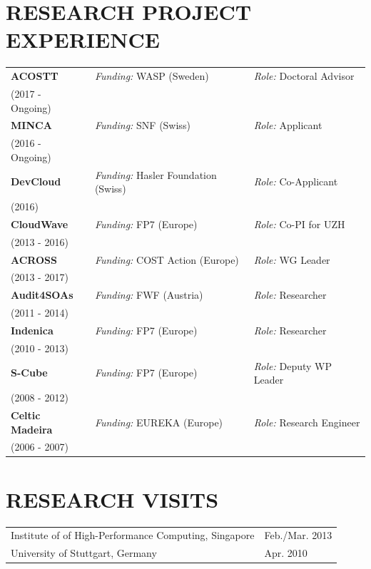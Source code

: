 \documentclass[paper=letter,fontsize=11pt]{scrartcl} %
\newcommand{\NewPart}[2]{\section*{\uppercase{#1} #2}}
\begin{document}
\NewPart{Research Project Experience}{}

  \begin{tabular}{p{4.8cm}ll}
		\textbf{ACOSTT} & \emph{Funding:} WASP (Sweden) & \emph{Role:} Doctoral Advisor \\
	(2017 - Ongoing) & & \\
      \textbf{MINCA} & \emph{Funding:} SNF (Swiss) & \emph{Role:} Applicant \\
    (2016 - Ongoing) & & \\
    \textbf{DevCloud} & \emph{Funding:} Hasler Foundation (Swiss) & \emph{Role:} Co-Applicant \\
    (2016) & & \\
    \textbf{CloudWave} & \emph{Funding:} FP7 (Europe) & \emph{Role:} Co-PI for UZH \\
    (2013 - 2016) & & \\
    \textbf{ACROSS}  & \emph{Funding:} COST Action (Europe) & \emph{Role:} WG Leader  \\
    (2013 - 2017) & & \\
    \textbf{Audit4SOAs}  & \emph{Funding:} FWF (Austria) & \emph{Role:} Researcher \\
    (2011 - 2014) & & \\
    \textbf{Indenica}  & \emph{Funding:} FP7 (Europe) & \emph{Role:} Researcher \\
    (2010 - 2013) & & \\
    \textbf{S-Cube} & \emph{Funding:} FP7 (Europe) & \emph{Role:} Deputy WP Leader\\
    (2008 - 2012) & & \\
    \textbf{Celtic Madeira}  & \emph{Funding:} EUREKA (Europe) & \emph{Role:} Research Engineer\\
    (2006 - 2007) & & \\
  \end{tabular}

\NewPart{Research Visits}{}

  \begin{tabular}{p{12cm}l}
    Institute of of High-Performance Computing, Singapore & Feb./Mar. 2013 \\
    University of Stuttgart, Germany & Apr. 2010 \\
  \end{tabular}
\end{document}
